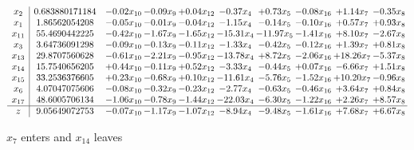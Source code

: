 \documentclass[9pt]{article}
\begin{document}
 \[\begin{array}{c| c c@{\hskip 2pt} c@{\hskip 2pt} c@{\hskip 2pt} c@{\hskip 2pt} c@{\hskip 2pt} c@{\hskip 2pt} c@{\hskip 2pt} c@{\hskip 2pt} }
 x_{2}   &  0.683880171184 & -0.02 x_{10} & -0.09 x_{9} & +  0.04 x_{12} & -0.37 x_{4} & +  0.73 x_{5} & -0.08 x_{16} & +  1.14 x_{7} & -0.35 x_{8}\\
 x_{1}   &  1.86562054208 & -0.05 x_{10} & -0.01 x_{9} & -0.04 x_{12} & -1.15 x_{4} & -0.14 x_{5} & -0.10 x_{16} & +  0.57 x_{7} & +  0.93 x_{8}\\
 x_{11}   &  55.4690442225 & -0.42 x_{10} & -1.67 x_{9} & -1.65 x_{12} & -15.31 x_{4} & -11.97 x_{5} & -1.41 x_{16} & +  8.10 x_{7} & -2.67 x_{8}\\
 x_{3}   &  3.64736091298 & -0.09 x_{10} & -0.13 x_{9} & -0.11 x_{12} & -1.33 x_{4} & -0.42 x_{5} & -0.12 x_{16} & +  1.39 x_{7} & +  0.81 x_{8}\\
 x_{13}   &  29.8707560628 & -0.61 x_{10} & -2.21 x_{9} & -0.95 x_{12} & -13.78 x_{4} & +  8.72 x_{5} & -2.06 x_{16} & + 18.26 x_{7} & -5.37 x_{8}\\
 x_{14}   &  15.7540656205 & +  0.44 x_{10} & -0.11 x_{9} & +  0.52 x_{12} & -3.33 x_{4} & -0.44 x_{5} & +  0.07 x_{16} & -6.66 x_{7} & +  1.51 x_{8}\\
 x_{15}   &  33.2536376605 & +  0.23 x_{10} & -0.68 x_{9} & +  0.10 x_{12} & -11.61 x_{4} & -5.76 x_{5} & -1.52 x_{16} & + 10.20 x_{7} & -0.96 x_{8}\\
 x_{6}   &  4.07047075606 & -0.08 x_{10} & -0.32 x_{9} & -0.23 x_{12} & -2.77 x_{4} & -0.63 x_{5} & -0.46 x_{16} & +  3.64 x_{7} & +  0.84 x_{8}\\
 x_{17}   &  48.6005706134 & -1.06 x_{10} & -0.78 x_{9} & -1.44 x_{12} & -22.03 x_{4} & -6.30 x_{5} & -1.22 x_{16} & +  2.26 x_{7} & +  8.57 x_{8}\\
\hline
z    &  9.05649072753 & -0.07 x_{10} & -1.17 x_{9} & -1.07 x_{12} & -8.94 x_{4} & -9.48 x_{5} & -1.61 x_{16} & +  7.68 x_{7} & +  6.67 x_{8}\\
\end{array}\]


 $ x_{7} $ enters and $ x_{14} $ leaves 
\end{document}
